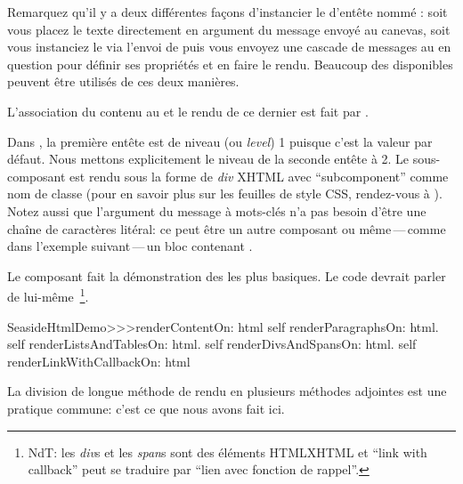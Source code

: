 \documentclass[a4paper,10pt,twoside]{book}
\begin{document}
Remarquez qu'il y a deux différentes façons d'instancier le \brush
d'entête nommé :
soit vous placez le texte directement en argument du message
envoyé au canevas,
soit vous instanciez le \brush via l'envoi de  puis 
vous envoyez une cascade de messages au \brush{} en question pour
définir ses propriétés et en faire le rendu.
Beaucoup des \brushes disponibles peuvent être utilisés de ces deux
manières.

L'association du contenu au \brush{} et le rendu de ce dernier est
fait par .

Dans , la première entête est de niveau
(ou \emph{level}) 1 puisque c'est la valeur par défaut.
Nous mettons explicitement le niveau de la seconde entête à 2.
Le sous-composant est rendu sous la forme de \emph{div} XHTML avec
``subcomponent'' comme nom de classe  (pour en savoir plus
sur les feuilles de style CSS, rendez-vous à ).
Notez aussi que l'argument du message à mots-clés  n'a pas
besoin d'être une chaîne de caractères litéral: ce peut être un autre
composant ou même\,---\,comme dans l'exemple suivant\,---\,un
bloc contenant .

Le composant  fait la démonstration des \brushes{}
les plus basiques.
Le code devrait parler de lui-même~\footnote{NdT: les \emph{div}{s} et
  les \emph{span}{s} sont des éléments HTML\/XHTML et ``link with
  callback'' peut se traduire par ``lien avec fonction de rappel''.}.


\begin{code}{}
SeasideHtmlDemo>>>renderContentOn: html 
	self renderParagraphsOn: html.
	self renderListsAndTablesOn: html.
	self renderDivsAndSpansOn: html.
	self renderLinkWithCallbackOn: html
\end{code}

La division de longue méthode de rendu en plusieurs méthodes adjointes
est une pratique commune: c'est ce que nous avons fait ici.

\end{document}
